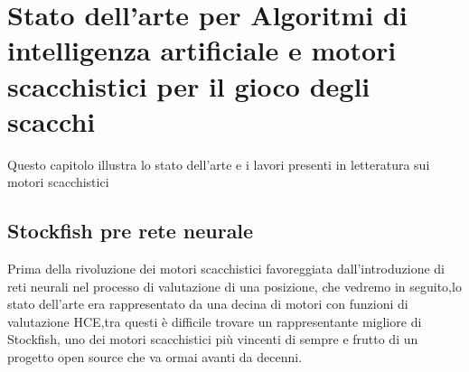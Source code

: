 \chapter{Stato dell'arte per Algoritmi di intelligenza artificiale e motori scacchistici  per il gioco degli scacchi} %
%

\begin{citazione}
Questo capitolo illustra lo stato dell'arte e i lavori presenti in letteratura sui motori scacchistici
\end{citazione}

\newpage


\section{Stockfish pre rete neurale }
Prima della rivoluzione dei motori scacchistici favoreggiata dall'introduzione di reti neurali nel processo di valutazione di una posizione, che vedremo in seguito,lo stato dell'arte era rappresentato
da una decina di motori con funzioni di valutazione HCE,tra questi è difficile trovare un rappresentante migliore di Stockfish, uno dei motori scacchistici più vincenti di sempre e frutto di un progetto
open source che va ormai avanti da decenni.
